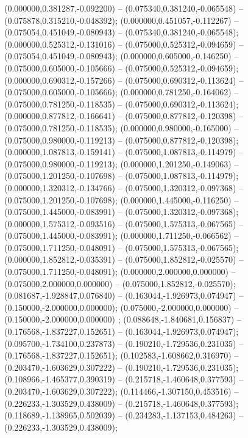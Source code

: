  (0.000000,0.381287,-0.092200) -- (0.075340,0.381240,-0.065548) -- (0.075878,0.315210,-0.048392);
 (0.000000,0.451057,-0.112267) -- (0.075054,0.451049,-0.080943) -- (0.075340,0.381240,-0.065548);
 (0.000000,0.525312,-0.131016) -- (0.075000,0.525312,-0.094659) -- (0.075054,0.451049,-0.080943);
 (0.000000,0.605000,-0.146250) -- (0.075000,0.605000,-0.105666) -- (0.075000,0.525312,-0.094659);
 (0.000000,0.690312,-0.157266) -- (0.075000,0.690312,-0.113624) -- (0.075000,0.605000,-0.105666);
 (0.000000,0.781250,-0.164062) -- (0.075000,0.781250,-0.118535) -- (0.075000,0.690312,-0.113624);
 (0.000000,0.877812,-0.166641) -- (0.075000,0.877812,-0.120398) -- (0.075000,0.781250,-0.118535);
 (0.000000,0.980000,-0.165000) -- (0.075000,0.980000,-0.119213) -- (0.075000,0.877812,-0.120398);
 (0.000000,1.087813,-0.159141) -- (0.075000,1.087813,-0.114979) -- (0.075000,0.980000,-0.119213);
 (0.000000,1.201250,-0.149063) -- (0.075000,1.201250,-0.107698) -- (0.075000,1.087813,-0.114979);
 (0.000000,1.320312,-0.134766) -- (0.075000,1.320312,-0.097368) -- (0.075000,1.201250,-0.107698);
 (0.000000,1.445000,-0.116250) -- (0.075000,1.445000,-0.083991) -- (0.075000,1.320312,-0.097368);
 (0.000000,1.575312,-0.093516) -- (0.075000,1.575313,-0.067565) -- (0.075000,1.445000,-0.083991);
 (0.000000,1.711250,-0.066562) -- (0.075000,1.711250,-0.048091) -- (0.075000,1.575313,-0.067565);
 (0.000000,1.852812,-0.035391) -- (0.075000,1.852812,-0.025570) -- (0.075000,1.711250,-0.048091);
 (0.000000,2.000000,0.000000) -- (0.075000,2.000000,0.000000) -- (0.075000,1.852812,-0.025570);
 (0.081687,-1.928847,0.076840) -- (0.163044,-1.926973,0.074947) -- (0.150000,-2.000000,0.000000);
 (0.075000,-2.000000,0.000000) -- (0.150000,-2.000000,0.000000) ;
 (0.088648,-1.840681,0.156837) -- (0.176568,-1.837227,0.152651) -- (0.163044,-1.926973,0.074947);
 (0.095700,-1.734100,0.237873) -- (0.190210,-1.729536,0.231035) -- (0.176568,-1.837227,0.152651);
 (0.102583,-1.608662,0.316970) -- (0.203470,-1.603629,0.307222) -- (0.190210,-1.729536,0.231035);
 (0.108966,-1.465377,0.390319) -- (0.215718,-1.460648,0.377593) -- (0.203470,-1.603629,0.307222);
 (0.114466,-1.307150,0.453516) -- (0.226233,-1.303529,0.438009) -- (0.215718,-1.460648,0.377593);
 (0.118689,-1.138965,0.502039) -- (0.234283,-1.137153,0.484263) -- (0.226233,-1.303529,0.438009);
